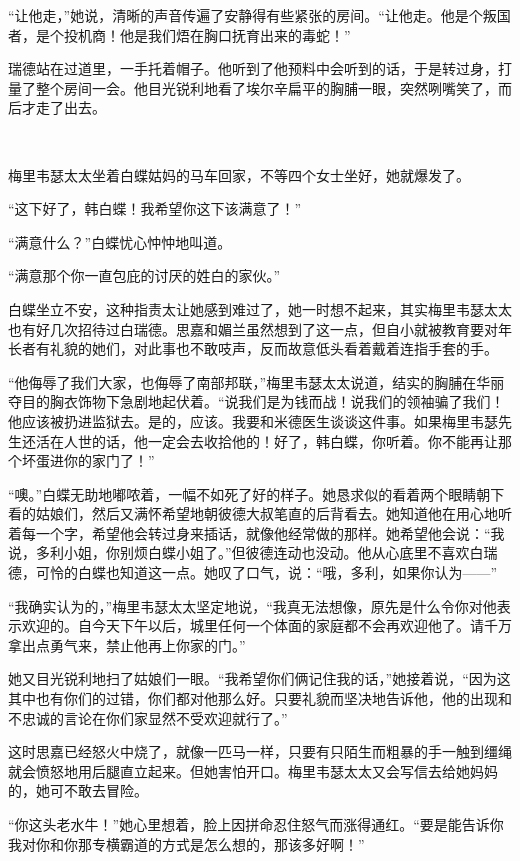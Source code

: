 \par “让他走，”她说，清晰的声音传遍了安静得有些紧张的房间。“让他走。他是个叛国者，是个投机商！他是我们焐在胸口抚育出来的毒蛇！”
\par 瑞德站在过道里，一手托着帽子。他听到了他预料中会听到的话，于是转过身，打量了整个房间一会。他目光锐利地看了埃尔辛扁平的胸脯一眼，突然咧嘴笑了，而后才走了出去。
\par  
\par 梅里韦瑟太太坐着白蝶姑妈的马车回家，不等四个女士坐好，她就爆发了。
\par “这下好了，韩白蝶！我希望你这下该满意了！”
\par “满意什么？”白蝶忧心忡忡地叫道。
\par “满意那个你一直包庇的讨厌的姓白的家伙。”
\par 白蝶坐立不安，这种指责太让她感到难过了，她一时想不起来，其实梅里韦瑟太太也有好几次招待过白瑞德。思嘉和媚兰虽然想到了这一点，但自小就被教育要对年长者有礼貌的她们，对此事也不敢吱声，反而故意低头看着戴着连指手套的手。
\par “他侮辱了我们大家，也侮辱了南部邦联，”梅里韦瑟太太说道，结实的胸脯在华丽夺目的胸衣饰物下急剧地起伏着。“说我们是为钱而战！说我们的领袖骗了我们！他应该被扔进监狱去。是的，应该。我要和米德医生谈谈这件事。如果梅里韦瑟先生还活在人世的话，他一定会去收拾他的！好了，韩白蝶，你听着。你不能再让那个坏蛋进你的家门了！”
\par “噢。”白蝶无助地嘟哝着，一幅不如死了好的样子。她恳求似的看着两个眼睛朝下看的姑娘们，然后又满怀希望地朝彼德大叔笔直的后背看去。她知道他在用心地听着每一个字，希望他会转过身来插话，就像他经常做的那样。她希望他会说：“我说，多利小姐，你别烦白蝶小姐了。”但彼德连动也没动。他从心底里不喜欢白瑞德，可怜的白蝶也知道这一点。她叹了口气，说：“哦，多利，如果你认为——”
\par “我确实认为的，”梅里韦瑟太太坚定地说，“我真无法想像，原先是什么令你对他表示欢迎的。自今天下午以后，城里任何一个体面的家庭都不会再欢迎他了。请千万拿出点勇气来，禁止他再上你家的门。”
\par 她又目光锐利地扫了姑娘们一眼。“我希望你们俩记住我的话，”她接着说，“因为这其中也有你们的过错，你们都对他那么好。只要礼貌而坚决地告诉他，他的出现和不忠诚的言论在你们家显然不受欢迎就行了。”
\par 这时思嘉已经怒火中烧了，就像一匹马一样，只要有只陌生而粗暴的手一触到缰绳就会愤怒地用后腿直立起来。但她害怕开口。梅里韦瑟太太又会写信去给她妈妈的，她可不敢去冒险。
\par “你这头老水牛！”她心里想着，脸上因拼命忍住怒气而涨得通红。“要是能告诉你我对你和你那专横霸道的方式是怎么想的，那该多好啊！”
